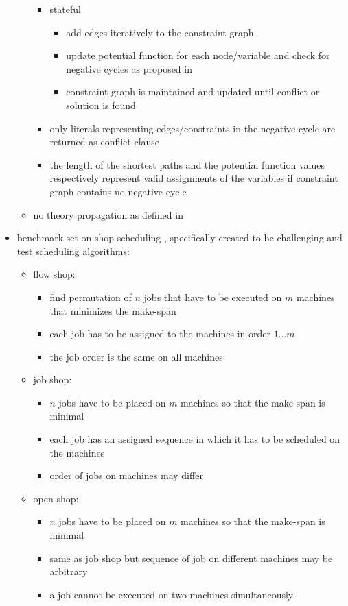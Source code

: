 \begin{itemize}
\begin{itemize}
\begin{itemize}
\begin{itemize}
	\end{itemize}
	\item stateful
	\begin{itemize}
	 \item add edges iteratively to the constraint graph
	 \item update potential function for each node/variable and check for negative cycles as proposed in \cite{coma06a}
	 \item constraint graph is maintained and updated until conflict or solution is found 
	\end{itemize}
	\item only literals representing edges/constraints in the negative cycle are returned as conflict clause
	\item the length of the shortest paths and the potential function values respectively 
	      represent valid assignments of the variables if constraint graph contains no negative cycle
     \end{itemize}
     \item no theory propagation as defined in \cite{niolti06a}
    \end{itemize}

 \item benchmark set on shop scheduling \cite{ta93a}, specifically created to be challenging and test scheduling algorithms:
    \begin{itemize}
     \item flow shop:
	\begin{itemize}
	 \item find permutation of $n$ jobs that have to be executed on $m$ machines that minimizes the make-span
	 \item each job has to be assigned to the machines in order $1\dots m$
	 \item the job order is the same on all machines
	\end{itemize}
     \item job shop:
	\begin{itemize}
	 \item $n$ jobs have to be placed on $m$ machines so that the make-span is minimal
	 \item each job has an assigned sequence in which it has to be scheduled on the machines
	 \item order of jobs on machines may differ
	\end{itemize}
     \item open shop:
	\begin{itemize}
	 \item $n$ jobs have to be placed on $m$ machines so that the make-span is minimal
	 \item same as job shop but sequence of job on different machines may be arbitrary
	 \item a job cannot be executed on two machines simultaneously 
	\end{itemize}
    \end{itemize}
    

\end{itemize}

